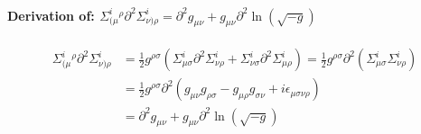 \documentclass[10pt]{report}
\theoremstyle{definition}
\begin{document}
        \paragraph{Derivation of: \texorpdfstring{$\Sigma^i_{(\mu}{}^\rho \partial^2 \Sigma^i_{\nu)\rho} = \partial^2 g_{\mu\nu} + g_{\mu\nu} \partial^2 \ln(\sqrt{-g})$}{PDFString}}
        \begin{align}
            \Sigma^i_{(\mu}{}^\rho \partial^2 \Sigma^i_{\nu)\rho} &= \frac{1}{2}g^{\rho\sigma} \left( \Sigma^i_{\mu\sigma} \partial^2 \Sigma^i_{\nu\rho} + \Sigma^i_{\nu\sigma} \partial^2 \Sigma^i_{\mu\rho} \right) = \frac{1}{2}g^{\rho\sigma} \partial^2\left( \Sigma^i_{\mu\sigma} \Sigma^i_{\nu\rho} \right) \nonumber\\ &= \frac{1}{2} g^{\rho\sigma} \partial^2 \left( g_{\mu\nu} g_{\rho\sigma} - g_{\mu\rho} g_{\sigma\nu} + i \epsilon_{\mu\sigma\nu\rho} \right) \nonumber\\ &= \partial^2 g_{\mu\nu} + g_{\mu\nu} \partial^2 \ln(\sqrt{-g})
        \end{align}
\end{document}
